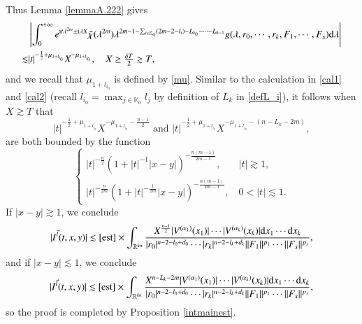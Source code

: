 \documentclass[11pt,reqno]{amsart}
\def\d{{\rm d}}
\numberwithin{equation}{section}
\theoremstyle{definition}
\begin{document}
Thus Lemma \ref{lemmaA.222} gives
\begin{equation*}
	\begin{split}
		&\left|\int_0^{+\infty}e^{\mathrm{i}t\lambda^{2m}\pm\mathrm{i}\lambda X}\tilde{\chi}(\lambda^{2m})\lambda^{2m-1-\sum_{i\in\mathbb{K}_0}(2m-2-l_i)-L_{k_0}-\cdots-L_{k-1}}g(\lambda,r_0,\cdots,r_k,F_1,\cdots,F_s)\d\lambda\right|\\
		\lesssim&|t|^{-\frac12+\mu_{1+l_{i_0}}}X^{-\mu_{1+l_{i_0}}},\quad \mbox{$X\geq\frac{\delta T}{2}\gtrsim T$},
	\end{split}
\end{equation*}
and we recall that $\mu_{1+l_{i_0}}$ is defined by \eqref{mu}. Similar to the calculation in \eqref{cal1} and \eqref{cal2} (recall $l_{i_0}=\max_{j\in\mathbb{K}_0}l_j$ by definition of $L_k$ in \eqref{defL_i}), it follows when $X\gtrsim T$ that
\begin{equation*}
	|t|^{-\frac12+\mu_{1+l_{i_0}}}X^{-\mu_{1+l_{i_0}}-\frac{n-1}{2}}\text{~and~}|t|^{-\frac12+\mu_{1+l_{i_0}}}X^{-\mu_{1+l_{i_0}}-(n-L_k-2m)},
\end{equation*}
are both bounded by the function
\begin{equation}\label{est}
	\begin{cases}
		|t|^{-\frac n2}(1+|t|^{-1}|x-y|)^{-\frac{n(m-1)}{2m-1}},\quad&|t|\gtrsim1,\\
		|t|^{-\frac{n}{2m}}(1+|t|^{-\frac{1}{2m}}|x-y|)^{-\frac{n(m-1)}{2m-1}},&0<|t|\lesssim1.
	\end{cases}
\end{equation}
If $|x-y|\gtrsim1$, we conclude
\begin{equation*}
	|I^{\vec{l}}(t,x,y)|\lesssim\eqref{est}\times\int_{\mathbb{R}^{kn}}\frac{X^\frac{n-1}{2}|V^{(\alpha_1)}(x_1)|\cdots|V^{(\alpha_k)}(x_k)|\d x_1\cdots \d x_k}{|r_0|^{n-2-l_0+d_0}\cdots|r_k|^{n-2-l_k+d_k}\|F_1\|^{p_1}\cdots\|F_s\|^{p_s}},
\end{equation*}
and if $|x-y|\lesssim1$, we conclude
\begin{equation*}
	|I^{\vec{l}}(t,x,y)|\lesssim\eqref{est}\times\int_{\mathbb{R}^{kn}}\frac{X^{n-L_k-2m}|V^{(\alpha_1)}(x_1)|\cdots|V^{(\alpha_k)}(x_k)|\d x_1\cdots \d x_k}{|r_0|^{n-2-l_0+d_0}\cdots|r_k|^{n-2-l_k+d_k}\|F_1\|^{p_1}\cdots\|F_s\|^{p_s}},
\end{equation*}
so the proof is completed by Proposition \ref{intmainest}.
\end{document}
